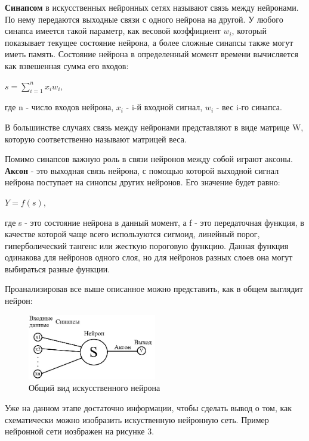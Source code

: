 \documentclass[bachelor, och, coursework]{shiza}
\begin{document}
\textbf{Синапсом} в искусственных нейронных сетях называют связь между нейронами. По нему передаются выходные связи с одного нейрона на 
другой. У любого синапса имеется такой параметр, как весовой коэффициент $w_i$, который показывает текущее состояние нейрона, а более сложные 
синапсы также могут иметь память. Состояние нейрона в определенный момент времени вычисляется как взвешенная сумма его входов:

\begin{center}
    $ s = \sum\limits_{i=1}^nx_iw_i$,
\end{center}
где n - число входов нейрона, $x_i$ - i-й входной сигнал, $w_i$ - вес i-го синапса.

В большинстве случаях связь между нейронами представляют в виде матрице W, которую соответственно называют матрицей веса.

Помимо синапсов важную роль в связи нейронов между собой играют аксоны. \textbf{Аксон} - это выходная связь нейрона, с помощью которой выходной 
сигнал нейрона поступает на синопсы других нейронов. Его значение будет равно:

\begin{center}
    $ Y = f(s)$,
\end{center}
где s - это состояние нейрона в данный момент, а f - это передаточная функция, в качестве которой чаще всего используются сигмоид, линейный порог,
гиперболический тангенс или жесткую пороговую функцию. Данная функция одинакова для нейронов одного слоя, но для нейронов разных слоев она могут
выбираться разные функции.

Проанализировав все выше описанное можно представить, как в общем выглядит нейрон:

\begin{figure}[H]
    \centering
    \includegraphics[width=0.5\textwidth]{3}
    \caption{Общий вид искусственного нейрона}
    \label{fig:img1}
\end{figure}

Уже на данном этапе достаточно информации, чтобы сделать вывод о том, как схематически можно изобразить искуственную нейронную сеть. Пример нейронной 
сети иозбражен на рисунке 3.
\end{document}
